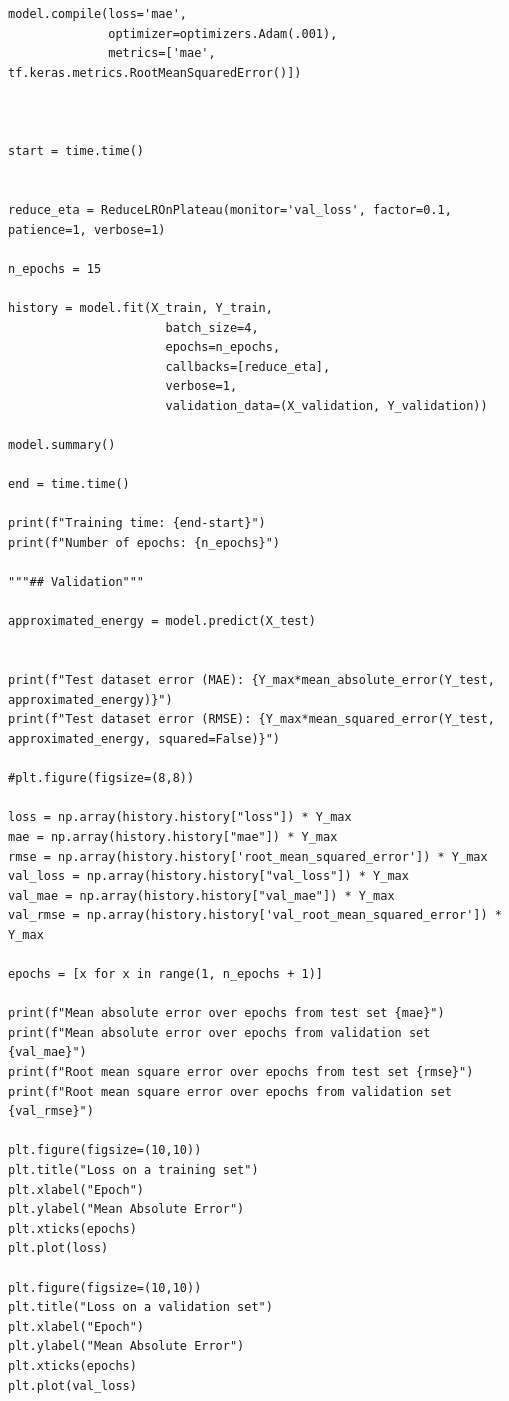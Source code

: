 \documentclass[a4paper,oneside,openright,11pt]{book}
\begin{document}
\begin{verbatim}
model.compile(loss='mae',
              optimizer=optimizers.Adam(.001),
              metrics=['mae', tf.keras.metrics.RootMeanSquaredError()])



start = time.time()


reduce_eta = ReduceLROnPlateau(monitor='val_loss', factor=0.1, patience=1, verbose=1)

n_epochs = 15

history = model.fit(X_train, Y_train,
                      batch_size=4,
                      epochs=n_epochs, 
                      callbacks=[reduce_eta],
                      verbose=1,
                      validation_data=(X_validation, Y_validation))

model.summary()

end = time.time()

print(f"Training time: {end-start}")
print(f"Number of epochs: {n_epochs}")

"""## Validation"""

approximated_energy = model.predict(X_test)


print(f"Test dataset error (MAE): {Y_max*mean_absolute_error(Y_test, approximated_energy)}")
print(f"Test dataset error (RMSE): {Y_max*mean_squared_error(Y_test, approximated_energy, squared=False)}")

#plt.figure(figsize=(8,8))

loss = np.array(history.history["loss"]) * Y_max
mae = np.array(history.history["mae"]) * Y_max
rmse = np.array(history.history['root_mean_squared_error']) * Y_max
val_loss = np.array(history.history["val_loss"]) * Y_max
val_mae = np.array(history.history["val_mae"]) * Y_max
val_rmse = np.array(history.history['val_root_mean_squared_error']) * Y_max

epochs = [x for x in range(1, n_epochs + 1)]

print(f"Mean absolute error over epochs from test set {mae}")
print(f"Mean absolute error over epochs from validation set {val_mae}")
print(f"Root mean square error over epochs from test set {rmse}")
print(f"Root mean square error over epochs from validation set {val_rmse}")

plt.figure(figsize=(10,10))
plt.title("Loss on a training set")
plt.xlabel("Epoch")
plt.ylabel("Mean Absolute Error")
plt.xticks(epochs)
plt.plot(loss)

plt.figure(figsize=(10,10))
plt.title("Loss on a validation set")
plt.xlabel("Epoch")
plt.ylabel("Mean Absolute Error")
plt.xticks(epochs)
plt.plot(val_loss)


\end{verbatim}
\end{document}
